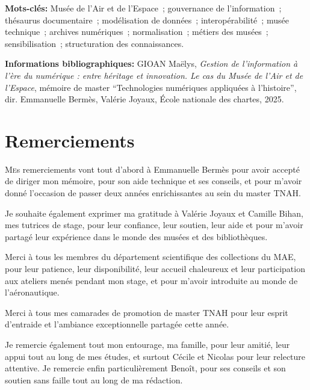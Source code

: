 \documentclass[12pt,twoside]{book}
\begin{document}
	\newpage
	\textbf{Mots-clés:} Musée de l’Air et de l’Espace~; gouvernance de l’information~; thésaurus documentaire~; modélisation de données~; interopérabilité~; musée technique~; archives numériques~; normalisation~; métiers des musées~; sensibilisation~; structuration des connaissances.
	
	\textbf{Informations bibliographiques:} GIOAN Maëlys, \textit{Gestion de l'information à l'ère du numérique : entre héritage et innovation. Le cas du Musée de l'Air et de l'Espace}, mémoire de master \enquote{Technologies numériques appliquées à l'histoire}, dir. Emmanuelle Bermès, Valérie Joyaux, École nationale des chartes, 2025.
	
	\newpage{\pagestyle{empty}\cleardoublepage}
	
	
	\chapter{Remerciements}
	
	\lettrine{M}es remerciements vont tout d'abord à Emmanuelle Bermès pour avoir accepté de diriger mon mémoire, pour son aide technique et ses conseils, et pour m'avoir donné l'occasion de passer deux années enrichissantes au sein du master TNAH.
	
	Je souhaite également exprimer ma gratitude à Valérie Joyaux et Camille Bihan, mes tutrices de stage, pour leur confiance, leur soutien, leur aide et pour m'avoir partagé leur expérience dans le monde des musées et des bibliothèques.
	
	Merci à tous les membres du département scientifique des collections du MAE, pour leur patience, leur disponibilité, leur accueil chaleureux et leur participation aux ateliers menés pendant mon stage, et pour m'avoir introduite au monde de l'aéronautique.
	
	Merci à tous mes camarades de promotion de master TNAH pour leur esprit d'entraide et l'ambiance exceptionnelle partagée cette année.
	
	Je remercie également tout mon entourage, ma famille, pour leur amitié, leur appui tout au long de mes études, et surtout Cécile et Nicolas pour leur relecture attentive. Je remercie enfin particulièrement Benoît, pour ses conseils et son soutien sans faille tout au long de ma rédaction.
	
	\newpage{\pagestyle{empty}\cleardoublepage}
	
\end{document}
